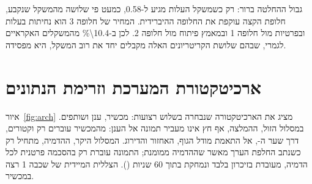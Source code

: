 גבול ההחלטה ברור: רק כשמשקל העלות מגיע ל-\num{0.58}, כמעט פי שלושה מהמשקל שנקבע, חלופת הקצה עוקפת את החלופה ההיברידית. המחיר של חלופה \num{3} הוא נחיתות בעלות ובפרטיות מול חלופה \num{1} ובמאמץ פיתוח מול חלופה \num{2}. לכן ב-\num{10.4\%} מהמשקלים האקראיים לגמרי, שבהם שלושת הקריטריונים האלה מקבלים יחד את רוב המשקל, היא מפסידה.
\section{ארכיטקטורת המערכת וזרימת הנתונים}
\label{sec:arch}

איור~\ref{fig:arch} מציג את הארכיטקטורה שנבחרה בשלוש רצועות: מכשיר, ענן ושותפים. במסלול הזול, ההמלצה, אף חץ אינו מעביר תמונה אל הענן: מהמכשיר עוברים רק וקטורים, דרך שער ה-, אל התאמת מודל הגוף, האחזור והדירוג. המסלול היקר, ההדמיה, מתחיל רק כשנתב החלפת הערך מאשר שההדמיה ממומנת; התמונה עוברת רק בהסכמה פרטנית לכל הדמיה, מעובדת בזיכרון בלבד ונמחקת בתוך \num{60} שניות (). הצללית המיידית של שכבה \num{1} רצה במכשיר.

